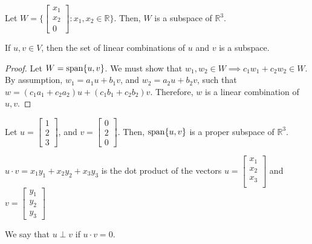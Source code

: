 \begin{eg}
	Let \( W=\{\begin{bmatrix}
		x_{1}\\
		x_{2}\\
		0
	\end{bmatrix} : x_{1},x_{2} \in \mathbb{R}\}   \). Then, \( W \) is a subspace of \( \mathbb{R}^3 \).
\end{eg}

\begin{theorem}
	If \( u,v \in V \), then the set of linear combinations of \( u \) and \( v \) is a subspace.
\end{theorem}
\begin{proof}
	Let \( W= \operatorname{span}\{u, v\} \). We must show that \( w_{1},w_{2} \in W \implies c_{1}w_{1}+c_{2}w_{2} \in W \). By assumption, \( w_{1}=a_{1}u+b_{1}v \), and \( w_{2}=a_{2}u+b_{2}v \), such that \( w=(c_{1}a_{1}+c_{2}a_{2})u + (c_{1}b_{1}+c_{2}b_{2})v \). Therefore, \( w \) is a linear combination of \( u,v \).
\end{proof}

\begin{eg}
	Let \( u=\begin{bmatrix}
		1\\2\\3
	\end{bmatrix} \), and \( v=\begin{bmatrix}
		0\\2\\0
	\end{bmatrix} \). Then, \( \operatorname{span}\{u,v\}   \) is a proper subspace of \( \mathbb{R}^3 \).
\end{eg}

\begin{definition}
\( u\cdot v = x_{1}y_{1}+x_{2}y_{2}+x_{3}y_{3} \) is the dot product of the vectors \( u=\begin{bmatrix}
	x_{1}\\x_{2}\\x_{3}\\
\end{bmatrix} \) and \( v=\begin{bmatrix}
	y_{1}\\y_{2}\\y_{3}
\end{bmatrix} \)
\end{definition}

\begin{definition}
	We say that \( u \perp v \) if \( u\cdot v=0 \).
\end{definition}

